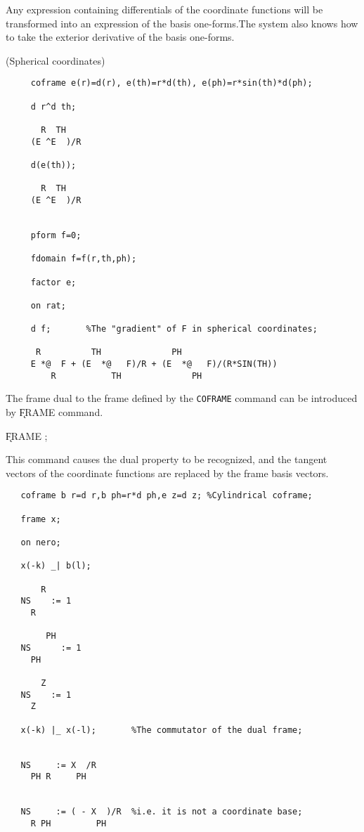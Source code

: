 Any expression containing differentials of the coordinate functions will
be transformed into an expression of the basis one-forms.The system also
knows how to take the exterior derivative of the basis one-forms.

\example (Spherical coordinates)

\begin{verbatim}
     coframe e(r)=d(r), e(th)=r*d(th), e(ph)=r*sin(th)*d(ph);

     d r^d th;

       R  TH
     (E ^E  )/R

     d(e(th));

       R  TH
     (E ^E  )/R


     pform f=0;

     fdomain f=f(r,th,ph);

     factor e;

     on rat;

     d f;       %The "gradient" of F in spherical coordinates;

      R          TH              PH
     E *@  F + (E  *@   F)/R + (E  *@   F)/(R*SIN(TH))
         R           TH              PH
\end{verbatim}

The frame dual to the frame defined by the {\tt COFRAME} command can
be introduced by \k{FRAME} command. 

\hspace*{2em} \k{FRAME} ;\label{FRAME}

This command causes the
dual property to be recognized, and the tangent vectors of the
coordinate functions are replaced by the frame basis vectors.

\example{}

\begin{verbatim}
   coframe b r=d r,b ph=r*d ph,e z=d z; %Cylindrical coframe;

   frame x;

   on nero;

   x(-k) _| b(l);

       R
   NS    := 1
     R

        PH
   NS      := 1
     PH

       Z
   NS    := 1
     Z

   x(-k) |_ x(-l);       %The commutator of the dual frame;


   NS     := X  /R
     PH R     PH


   NS     := ( - X  )/R  %i.e. it is not a coordinate base;
     R PH         PH

\end{verbatim}

